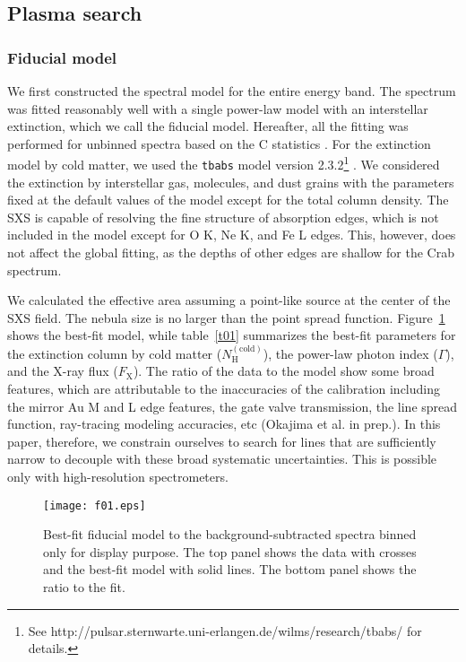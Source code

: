 \documentclass[]{pasj01}
\begin{document}
\subsection{Plasma search}\label{s3-1}
\subsubsection{Fiducial model}\label{s3-1-1}
We first constructed the spectral model for the entire energy band. The spectrum was
fitted reasonably well with a single power-law model with an interstellar extinction,
which we call the fiducial model. Hereafter, all the fitting was performed for unbinned
spectra based on the C statistics \citep{cash79}. For the extinction model by cold
matter, we used the \texttt{tbabs} model version 2.3.2\footnote{See
http://pulsar.sternwarte.uni-erlangen.de/wilms/research/tbabs/ for details.}
\citep{wilms00}. We considered the extinction by interstellar gas, molecules, and dust
grains with the parameters fixed at the default values of the model except for the total
column density. The SXS is capable of resolving the fine structure of absorption edges,
which is not included in the model except for O K, Ne K, and Fe L edges. This, however,
does not affect the global fitting, as the depths of other edges are shallow for the Crab
spectrum.

We calculated the effective area assuming a point-like source at the center of the SXS
field. The nebula size is no larger than the point spread function. Figure~\ref{f01}
shows the best-fit model, while table~\ref{t01} summarizes the best-fit parameters for
the extinction column by cold matter ($N_{\mathrm{H}}^{\mathrm{(cold)}}$), the power-law
photon index ($\Gamma$), and the X-ray flux ($F_{\mathrm{X}}$). The ratio of the data to
the model show some broad features, which are attributable to the inaccuracies of the
calibration including the mirror Au M and L edge features, the gate valve transmission,
the line spread function, ray-tracing modeling accuracies, etc (Okajima et al. in
prep.). In this paper, therefore, we constrain ourselves to search for lines that are
sufficiently narrow to decouple with these broad systematic uncertainties. This is
possible only with high-resolution spectrometers.

\begin{figure}
 \begin{center}
  \texttt{[image: f01.eps]}
 \end{center}
 \vspace*{8mm}
 \caption{Best-fit fiducial model to the background-subtracted spectra binned only for
 display purpose. The top panel shows the data with crosses and the best-fit model with
 solid lines. The bottom panel shows the ratio to the fit.}
 \label{f01}
\end{figure}
\end{document}
